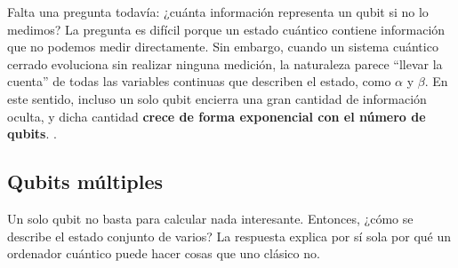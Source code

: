 Falta una pregunta todavía: ¿cuánta información representa un qubit si
no lo medimos? La pregunta es difícil porque un estado cuántico contiene información que no podemos medir directamente. 
Sin embargo, cuando un sistema cuántico cerrado evoluciona sin realizar ninguna medición, la naturaleza 
parece ``llevar la cuenta'' de todas las variables continuas que describen el estado, como $\alpha$ y $\beta$. 
En este sentido, incluso un solo qubit encierra una gran cantidad de información oculta, y dicha cantidad 
\textbf{crece de forma exponencial con el número de qubits}.
.

\subsection{Qubits múltiples}
\label{sec:multiples}
Un solo qubit no basta para calcular nada interesante. Entonces, ¿cómo
se describe el estado conjunto de varios? La respuesta explica por sí sola por
qué un ordenador cuántico puede hacer cosas que uno clásico no.

